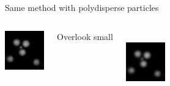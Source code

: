 \documentclass[xcolor=table]{beamer}
\begin{document}
\begin{frame}{Same method with polydisperse particles}
\begin{columns}[T]
	\includegraphics[width=\textwidth]{dillute_smaller_blur1}
	\centering
	{\strut{}Overlook small}\\
	\includegraphics[width=\textwidth]{dillute_smaller_blur1_5}

\end{columns}
\end{frame}
\end{document}
